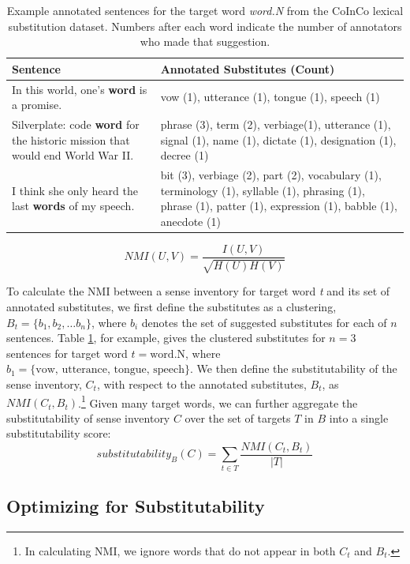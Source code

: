 \documentclass[11pt]{article}
\begin{document}
\begin{table}[t]
	\small
	\begin{tabular}{p{} p{}}
		\hline
		Sentence & Annotated Substitutes (Count) \\ \hline \hline
		In this world, one's \textbf{word} is a promise. & vow (1), utterance (1), tongue (1), speech (1) \\ \hline
		Silverplate: code \textbf{word} for the historic mission that would end World War II. & phrase (3), term (2), verbiage(1), utterance (1), signal (1), name (1), dictate (1), designation (1), decree (1) \\ \hline
		I think she only heard the last \textbf{words} of my speech. & bit (3), verbiage (2), part (2), vocabulary (1), terminology (1), syllable (1), phrasing (1), phrase (1), patter (1), expression (1), babble (1), anecdote (1) \\
	\end{tabular}
	\caption{Example annotated sentences for the target word \textit{word.N} from the CoInCo lexical substitution dataset. Numbers after each word indicate the number of annotators who made that suggestion.}
	\label{tab:lexsub}
\end{table}


\[NMI(U,V) = \frac{I(U,V)}{\sqrt{H(U)H(V)}}\]

\noindent To calculate the NMI between a sense inventory for target word \textit{t} and its set of annotated substitutes, we first define the substitutes as a clustering, $B_t = \{b_1, b_2, \dots b_n\}$, where $b_i$ denotes the set of suggested substitutes for each of $n$ sentences. Table \ref{tab:lexsub}, for example, gives the clustered substitutes for $n=3$ sentences for target word $t=\text{word.N}$, where $b_1 = \{\text{vow, utterance, tongue, speech}\}$. We then define the substitutability of the sense inventory, $C_t$, with respect to the annotated substitutes, $B_t$, as $NMI(C_t, B_t)$.\footnote{In calculating NMI, we ignore words that do not appear in both $C_t$ and $B_t$.} Given many target words, we can further aggregate the substitutability of sense inventory $C$ over the set of targets $T$ in $B$ into a single substitutability score:
\[substitutability_B(C) = \sum_{t \in T} \frac{NMI(C_t, B_t)}{|T|}\]

\subsection{Optimizing for Substitutability}
\label{optim}
\end{document}
